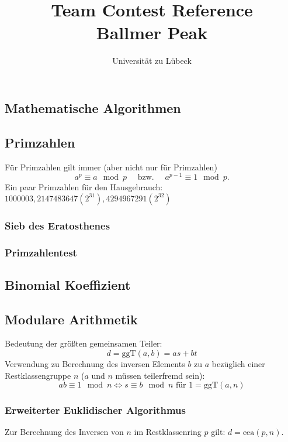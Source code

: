 \documentclass[10pt,a4paper,ngerman]{article}
\title{Team Contest Reference\\ Ballmer Peak}
\author{Universität zu Lübeck}
\begin{document}

\maketitle\thispagestyle{fancy}

\tableofcontents
\clearpage
\begin{multicols}{2}
\section{Mathematische Algorithmen}
\subsection{Primzahlen}
Für Primzahlen gilt immer (aber nicht nur für Primzahlen)
\[a^p\equiv a\mod p \quad\text{ bzw. }\quad a^{p-1}\equiv 1 \mod p.\]
Ein paar Primzahlen für den Hausgebrauch: $1000003, 2147483647 (2^{31}), 4294967291 (2^{32})$
\subsubsection{Sieb des Eratosthenes}

\subsubsection{Primzahlentest}

\subsection{Binomial Koeffizient}

\subsection{Modulare Arithmetik}
Bedeutung der größten gemeinsamen Teiler:
\[ d = \text{ggT}(a,b) = as+bt \]
Verwendung zu Berechnung des inversen Elements $b$ zu $a$ bezüglich einer Restklassengruppe $n$ ($a$ und $n$ müssen teilerfremd sein):
\[ ab\equiv 1 \mod n \Leftrightarrow s\equiv b \mod n \text{ für }1=\text{ggT}(a,n)\]
\subsubsection{Erweiterter Euklidischer Algorithmus}

Zur Berechnung des Inversen von $n$ im Restklassenring $p$ gilt: $d = \mathrm{eea}(p,n)$.

\end{multicols}
\end{document}
